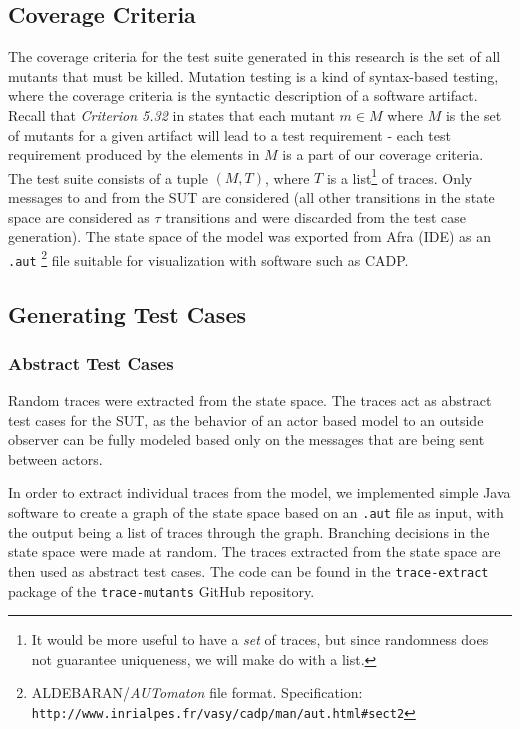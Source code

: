 \documentclass{article}
\begin{document}
		\subsection{Coverage Criteria}
			\label{sec:coveragecrit}
			The coverage criteria for the test suite generated in this research is the set of all mutants that must be killed. Mutation testing is a kind of syntax-based testing, where the coverage criteria is the syntactic description of a software artifact. Recall that \textit{Criterion 5.32} in \citet{ammann2008introduction} states that each mutant $m \in M$ where $M$ is the set of mutants for a given artifact will lead to a test requirement \-- each test requirement produced by the elements in $M$ is a part of our coverage criteria.
			The test suite consists of a tuple $(M, T)$, where $T$ is a list\footnote{It would be more useful to have a \textit{set} of traces, but since randomness does not guarantee uniqueness, we will make do with a list.} of traces. Only messages to and from the SUT are considered (all other transitions in the state space are considered as $\tau$ transitions and were discarded from the test case generation). The state space of the model was exported from Afra (\Rebeca IDE) as an \texttt{.aut}
			\footnote{ALDEBARAN/\textit{AUTomaton} file format. Specification: \texttt{http://www.inrialpes.fr/vasy/cadp/man/aut.html\#sect2}} file suitable for visualization with software such as CADP.

		\subsection{Generating Test Cases}
			\label{sec:method_testgen}
			\subsubsection{Abstract Test Cases}
				\label{sec:method_abstract}
				Random traces were extracted from the state space. The traces act as abstract test cases for the SUT, as the behavior of an actor based model to an outside observer can be fully modeled based only on the messages that are being sent between actors.

				In order to extract individual traces from the \Rebeca model, we implemented simple Java software to create a graph of the state space based on an \texttt{.aut} file as input, with the output being a list of traces through the graph. Branching decisions in the state space were made at random. The traces extracted from the state space are then used as abstract test cases.
				The code can be found in the \texttt{trace-extract} package of the \texttt{trace-mutants} GitHub repository. \nocite{trace-mutants}
\end{document}
